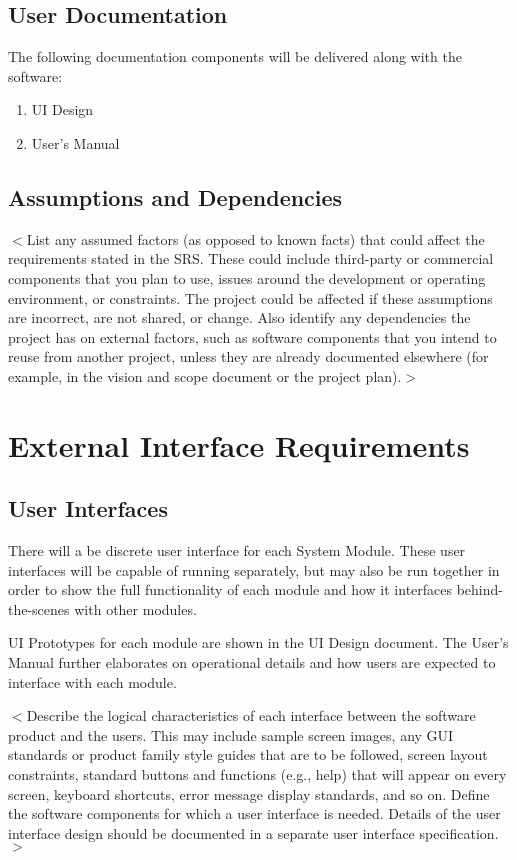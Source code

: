 \documentclass{scrreprt}
\begin{document}
\section{User Documentation}

The following documentation components will be delivered along with the software:
\begin{enumerate}
    \item UI Design
    \item User's Manual
\end{enumerate}

\section{Assumptions and Dependencies}

$<$List any assumed factors (as opposed to known facts) that could affect the 
requirements stated in the SRS. These could include third-party or commercial 
components that you plan to use, issues around the development or operating 
environment, or constraints. The project could be affected if these assumptions 
are incorrect, are not shared, or change. Also identify any dependencies the 
project has on external factors, such as software components that you intend to 
reuse from another project, unless they are already documented elsewhere (for 
example, in the vision and scope document or the project plan).$>$


\chapter{External Interface Requirements}

\section{User Interfaces}
There will a be discrete user interface for each System Module. These user
interfaces will be capable of running separately, but may also be run together
in order to show the full functionality of each module and how it interfaces
behind-the-scenes with other modules.

UI Prototypes for each module are shown in the UI Design document. The User's
Manual further elaborates on operational details and how users are expected to
interface with each module.



$<$Describe the logical characteristics of each interface between the software 
product and the users. This may include sample screen images, any GUI standards 
or product family style guides that are to be followed, screen layout 
constraints, standard buttons and functions (e.g., help) that will appear on 
every screen, keyboard shortcuts, error message display standards, and so on.  
Define the software components for which a user interface is needed. Details of 
the user interface design should be documented in a separate user interface 
specification.$>$
\end{document}

